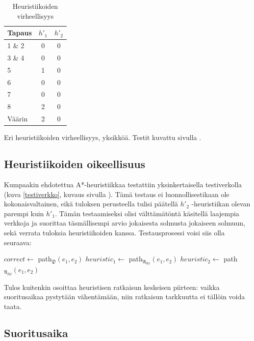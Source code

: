 \documentclass[10pt,a4paper]{article}
\begin{document}
\begin{table}
\begin{tabular}{l|c|c}
Tapaus & $ h'_1 $  & $ h'_2 $ \\ 
\hline 
1 \& 2 & 0 & 0 \\ 
3 \& 4 & 0 & 0 \\  
5 & 1 & 0 \\
6 & 0 & 0 \\
7 & 0 & 0 \\
8 & 2 & 0 \\
\hline
Väärin & 2 & 0 \\
\hline 
\end{tabular} 
\caption{Heuristiikoiden virheellisyys}
Eri heuristiikoiden virheellisyys, yksikköä. Testit kuvattu sivulla \pageref{network_test}.
\label{heuristic_correct}
\end{table}

\subsection{Heuristiikoiden oikeellisuus}
\label{heuristic_correctness}

Kumpaakin ehdotettua A*-heuristiikkaa testattiin yksinkertaisella testiverkolla (kuva \ref{testiverkko}, kuvaus sivulla \pageref{network_test}). Tämä testaus ei luonnollisestikaan ole kokonaisvaltainen, eikä tuloksen perusteella tulisi päätellä $h'_2$ -heuristiikan olevan parempi kuin $h'_1$. Tämän testaamiseksi olisi välttämätöntä käsitellä laajempia verkkoja ja suorittaa täsmällisempi arvio jokaisesta solmusta jokaiseen solmuun, sekä verrata tuloksia heuristiikoiden kanssa. Testausprosessi voisi siis olla seuraava:

\begin{algorithmic}
\State $correct \gets $ path$_\mathfrak{D}( e_1 , e_2 )$
\State $heuristic_1 \gets $ path$_\mathfrak{A_{H1}}( e_1 , e_2 )$
\State $heuristic_2 \gets $ path$_\mathfrak{A_{H2}}( e_1 , e_2 )$
\EndFor
\EndFor
\end{algorithmic}

Tulos kuitenkin osoittaa heuristisen ratkaisun keskeisen piirteen: vaikka suoritusaikaa pystytään vähentämään, niin ratkaisun tarkkuutta ei tällöin voida taata.

\subsection{Suoritusaika}
\label{suoritusaika}
\end{document}
